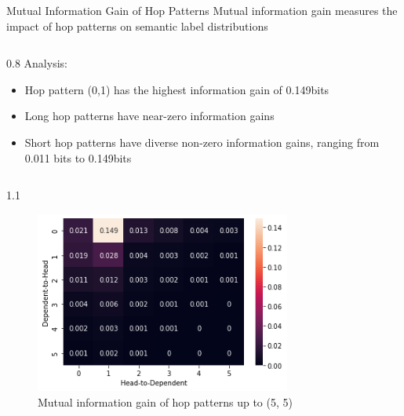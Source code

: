 \begin{alertblock}{Mutual Information Gain of Hop Patterns}
Mutual information gain measures the impact of hop patterns on semantic label distributions\\
\vspace{0.5cm}
{
\begin{column}{0.8\colwidth}
Analysis:
\begin{itemize}
    \item Hop pattern (0,1) has the highest information gain of 0.149bits
    \item Long hop patterns have near-zero information gains
    \item Short hop patterns have diverse non-zero information gains, ranging from 0.011 bits to 0.149bits
\end{itemize}
        
\end{column}
\begin{column}{1.1\colwidth}
\begin{figure}
    \centering
    \captionsetup{justification=centering}
    \vspace{-1cm}
    \includegraphics[width=0.75\textwidth]{images/ssdp-mi.png}
    \vspace{-0.5cm}
\caption{Mutual information gain of hop patterns up to (5, 5)}
    \label{fig:my_label}
\end{figure}


\end{column}}
\end{alertblock}
